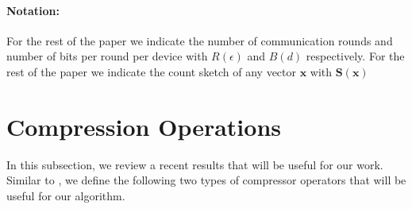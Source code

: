 \paragraph{Notation:} For the rest of the paper we indicate the number of communication rounds and number of bits per round per device with $R(\epsilon)$ and $B(d)$ respectively. For the rest of the paper we indicate the count sketch of any vector $\boldsymbol{x}$ with $\mathbf{S}(\boldsymbol{x})$
\section{Compression Operations}
In this subsection, we review a recent results that will be useful for our work. Similar to \cite{horvath2020better}, we define the following two types of compressor operators that will be useful for our algorithm.
